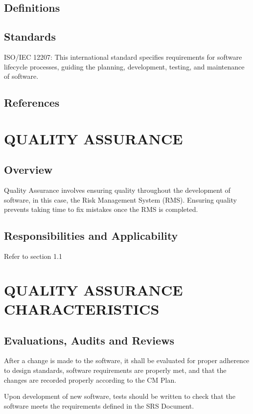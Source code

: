 \documentclass[letterpaper,12pt,oneside,listof=totoc]{scrreprt}
\begin{document}
\section{Definitions}
\section{Standards}
ISO/IEC 12207: This international standard specifies requirements for software lifecycle processes, guiding the planning, development, testing, and maintenance of software.

\section{References}

\chapter{QUALITY ASSURANCE}
\section{Overview}
Quality Assurance involves ensuring quality throughout the development of software, in this case, the Risk Management System (RMS). Ensuring quality prevents taking time to fix mistakes once the RMS is completed.\\

\section{Responsibilities and Applicability}
Refer to section 1.1\\

\chapter{QUALITY ASSURANCE CHARACTERISTICS}
\section{Evaluations, Audits and Reviews}
After a change is made to the software, it shall be evaluated for proper adherence to design standards, software requirements are properly met, and that the changes are recorded properly according to the CM Plan.

Upon development of new software, tests should be written to check that the software meets the requirements defined in the SRS Document.
\end{document}
